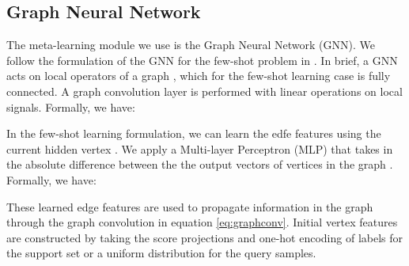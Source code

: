 \documentclass[final]{cvpr}
\begin{document}
\subsection{Graph Neural Network}
The meta-learning module we use is the Graph Neural Network (GNN). We follow the formulation of the GNN for the few-shot problem in \cite{satorras2018few}. In brief, a GNN acts on local operators of a graph , which for the few-shot learning case is fully connected. A graph convolution layer  \cite{satorras2018few} is performed with linear operations on local signals. Formally, we have:


In the few-shot learning formulation, we can learn the edfe features using the current hidden vertex \cite{satorras2018few}. We apply a Multi-layer Perceptron (MLP) that takes in the absolute difference between the the output vectors of vertices in the graph \cite{kearnes2016molecular} \cite{gilmer2017neural}. Formally, we have:

These learned edge features are used to propagate information in the graph through the graph convolution in equation \ref{eq:graphconv}. Initial vertex features are constructed by taking the score projections and one-hot encoding of labels for the support set or a uniform distribution for the query samples.
\end{document}
